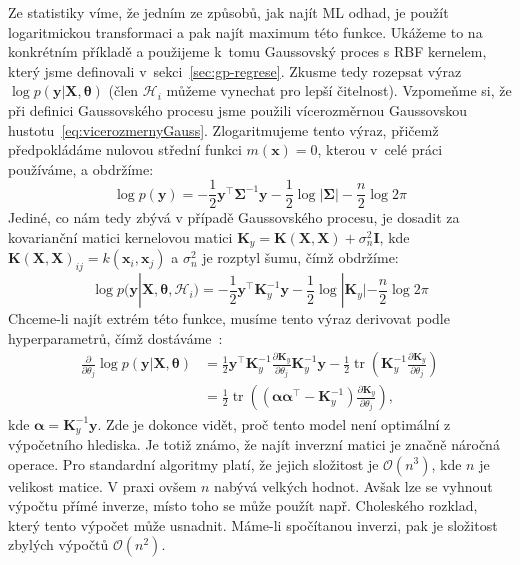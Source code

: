 Ze statistiky víme, že jedním ze způsobů, jak najít ML odhad, je použít logaritmickou transformaci a pak najít maximum této funkce.
Ukážeme to na konkrétním příkladě a použijeme k~tomu Gaussovský proces s RBF kernelem, který jsme definovali v~sekci~\ref{sec:gp-regrese}.
Zkusme tedy rozepsat výraz $\log p( \mathbf{y} | \mathbf{X}, \boldsymbol{\theta})$ (člen $\mathcal{H}_i$ můžeme vynechat pro lepší čitelnost).
Vzpomeňme si, že při definici Gaussovského procesu jsme použili vícerozměrnou Gaussovskou hustotu~\eqref{eq:vicerozmernyGauss}.
Zlogaritmujeme tento výraz, přičemž předpokládáme nulovou střední funkci $m(\mathbf{x}) = 0$, kterou v~celé práci používáme, a obdržíme:
\begin{equation}
  \log p(\mathbf{y}) = -\frac{1}{2}\mathbf{y}^\top \boldsymbol{\Sigma}^{-1}\mathbf{y} - \frac{1}{2}\log|\boldsymbol{\Sigma}| - \frac{n}{2}\log 2\pi
\end{equation}
Jediné, co nám tedy zbývá v případě Gaussovského procesu, je dosadit za kovarianční matici kernelovou matici $\mathbf{K}_y = \mathbf{K}(\mathbf{X}, \mathbf{X}) + \sigma_n^2 \mathbf{I}$, kde $\mathbf{K}(\mathbf{X},\mathbf{X})_{ij} = k(\mathbf{x}_i, \mathbf{x}_j)$ a $\sigma_n^2$ je rozptyl šumu, čímž obdržíme:
\begin{equation}
  \log p( \mathbf{y} | \mathbf{X}, \boldsymbol{\theta}, \mathcal{H}_i) = -\frac{1}{2}\mathbf{y}^\top \mathbf{K}_y^{-1}\mathbf{y} - \frac{1}{2}\log|\mathbf{K}_y| - \frac{n}{2}\log 2\pi
\end{equation}
Chceme-li najít extrém této funkce, musíme tento výraz derivovat podle hyperparametrů, čímž dostáváme~\cite{rasmussen2006}:
\begin{align}
  \frac{\partial}{\partial\theta_j} \log p(\mathbf{y}|\mathbf{X}, \boldsymbol{\theta})
    &= \frac{1}{2}\mathbf{y}^\top \mathbf{K}_y^{-1}\frac{\partial \mathbf{K}_y}{\partial\theta_j}\mathbf{K}_y^{-1}\mathbf{y} - \frac{1}{2} \operatorname{tr}\left(\mathbf{K}_y^{-1}\frac{\partial \mathbf{K}_y}{\partial\theta_j}\right) \nonumber \\
    &= \frac{1}{2} \operatorname{tr}\left(\left(\boldsymbol{\alpha}\boldsymbol{\alpha}^\top - \mathbf{K}_y^{-1}\right)\frac{\partial \mathbf{K}_y}{\partial\theta_j}\right),
\end{align}
kde $\boldsymbol{\alpha} = \mathbf{K}_y^{-1}\mathbf{y}$.
Zde je dokonce vidět, proč tento model není optimální z výpočetního hlediska. 
Je totiž známo, že najít inverzní matici je značně náročná operace.
Pro standardní algoritmy platí, že jejich složitost je $\mathcal{O}(n^3)$, kde $n$ je velikost matice.
V praxi ovšem $n$ nabývá velkých hodnot.
Avšak lze se vyhnout výpočtu přímé inverze, místo toho se může použít např. Choleského rozklad, který tento výpočet může usnadnit.
Máme-li spočítanou inverzi, pak je složitost zbylých výpočtů $\mathcal{O}(n^2)$.

